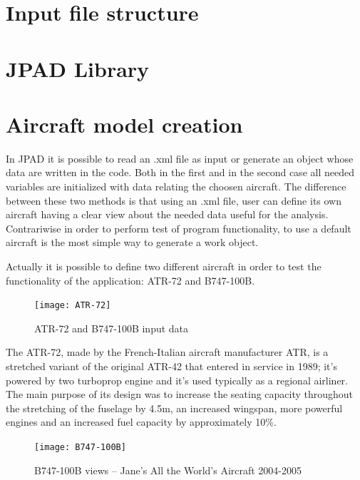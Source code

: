 \section{Input file structure}

\section{\gls{JPAD} Library}

\section{Aircraft model creation} \label{par:DefaultAircraft}
In \gls{JPAD} it is possible to read an .xml file as input or generate an object whose data are written in the code. Both in the first and in the second case all needed variables are initialized with data relating the choosen aircraft. The difference between these two methods is that using an .xml file, user can define its own aircraft having a clear view about the needed data useful for the analysis. Contrariwise in order to perform test of program functionality, to use a default aircraft is the most simple way to generate a work object.

\bigskip
\noindent
Actually it is possible to define two different aircraft in order to test the functionality of the application: ATR-72 and B747-100B.
%
\begin{figure}[H]
\centering
\texttt{[image: ATR-72]}
\caption{ATR-72 and B747-100B input data}
\label{fig:Figure6}
\end{figure}

\bigskip
\noindent
The ATR-72, made by the French-Italian aircraft manufacturer ATR, is a stretched variant of the original ATR-42 that entered in service in 1989; it’s powered by two turboprop engine and it’s used typically as a regional airliner. The main purpose of its design was to increase the seating capacity throughout the stretching of the fuselage by 4.5m, an increased wingspan, more powerful engines and an increased fuel capacity by approximately 10$\%$.
%
\begin{figure}[H]
\centering
\texttt{[image: B747-100B]}
\caption{B747-100B views – Jane's All the World's Aircraft 2004-2005}
\label{fig:Figure7}
\end{figure}

